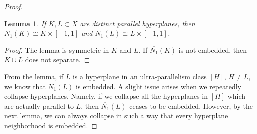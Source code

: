 \documentclass[11pt]{amsart}
\numberwithin{thm}{section}
\newtheorem{lemma}[thm]{Lemma}
\theoremstyle{remark}
\theoremstyle{definition}
\newcommand{\overl}[1]{\overline{#1}}
\newcommand{\lk}{\text{lk}}
\begin{document}
\begin{proof}
\begin{lemma} \label{productNbhd} If $K, L\subset X$ are distinct parallel hyperplanes, then $\overl{N_1}(K)\cong K\times [-1,1]$ and $\overl{N_1}(L)\cong L\times [-1,1]$.
\end{lemma}
\begin{proof} The lemma is symmetric in $K$ and $L$.  If $\overl{N_1}(K)$ is not embedded, then $K\cup L$ does not separate.  
\end{proof}

From the lemma, if $L$ is a hyperplane in an ultra-parallelism class $[H]$, $H\neq L$, we know that $\overl{N_1}(L)$ is embedded.  A slight issue arises when we repeatedly collapse hyperplanes.  Namely, if we collapse all the hyperplanes in $[H]$ which are actually parallel to $L$, then $\overl{N_1}(L)$ ceases to be embedded.  However, by the next lemma, we can always collapse in such a way that every hyperplane neighborhood is embedded.

%


\end{proof}
\end{document}
